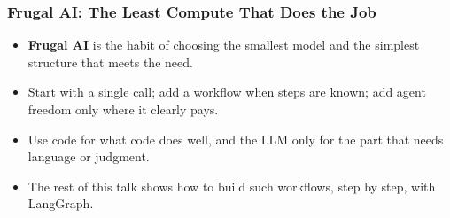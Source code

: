 \begin{frame}[fragile]\frametitle{Frugal AI: The Least Compute That Does the Job}
\begin{itemize}
\item \textbf{Frugal AI} is the habit of choosing the smallest model and the simplest structure that meets the need.
\item Start with a single call; add a workflow when steps are known; add agent freedom only where it clearly pays.
\item Use code for what code does well, and the LLM only for the part that needs language or judgment.
\item The rest of this talk shows how to build such workflows, step by step, with LangGraph.
\end{itemize}
\end{frame}
